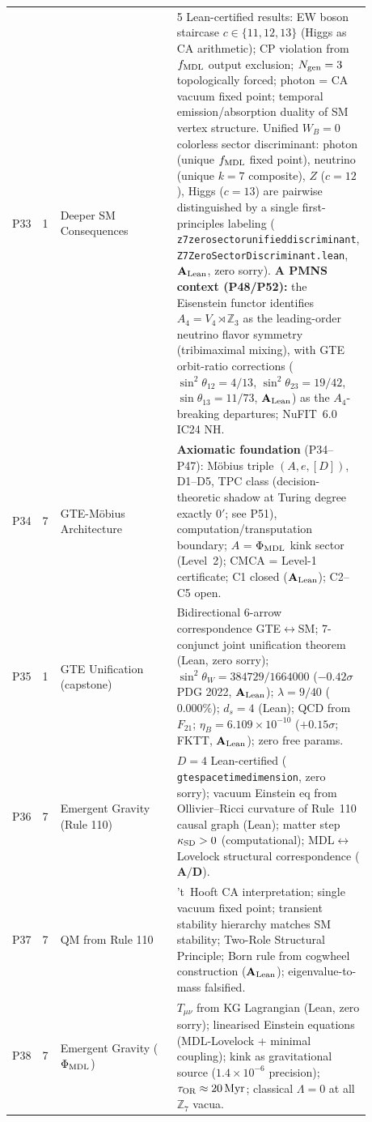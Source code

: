 \documentclass[11pt]{article}
\newcommand{\lean}[1]{%
  \penalty-100
  \begingroup\def\_{{\textunderscore\allowbreak}}\texttt{#1}\endgroup}
\newcommand{\CatAL}{\ensuremath{\textbf{A}_{\rm Lean}}}
\newcommand{\CatAD}{\textbf{A/D}}
\begin{document}
\begin{longtable}{@{}P{0.05\linewidth}P{0.05\linewidth}P{0.33\linewidth}P{0.45\linewidth}@{}}
P33 & 1 & Deeper SM Consequences & 5 Lean-certified results: EW boson staircase $c\in\{11,12,13\}$ (Higgs as CA arithmetic); CP violation from $f_{\rm MDL}$ output exclusion; $N_{\rm gen}=3$ topologically forced; photon = CA vacuum fixed point; temporal emission/absorption duality of SM vertex structure. Unified $W_B{=}0$ colorless sector discriminant: photon (unique $f_{\rm MDL}$ fixed point), neutrino (unique $k{=}7$ composite), $Z$ ($c{=}12$), Higgs ($c{=}13$) are pairwise distinguished by a single first-principles labeling (\lean{z7\_zero\_sector\_unified\_discriminant}, \lean{Z7ZeroSectorDiscriminant.lean}, $\CatAL$, zero sorry). \textbf{A PMNS context (P48/P52):} the Eisenstein functor identifies $A_4 = V_4 \rtimes \mathbb{Z}_3$ as the leading-order neutrino flavor symmetry (tribimaximal mixing), with GTE orbit-ratio corrections ($\sin^2\theta_{12}=4/13$, $\sin^2\theta_{23}=19/42$, $\sin\theta_{13}=11/73$, \CatAL) as the $A_4$-breaking departures; NuFIT~6.0 IC24 NH. \\
P34 & 7 & GTE-Möbius Architecture & \textbf{Axiomatic foundation} (P34--P47): Möbius triple $(A,e,[D])$, D1--D5, TPC class (decision-theoretic shadow at Turing degree exactly $0'$; see P51), computation/transputation boundary; $A$ = $\Phi_{\rm MDL}$ kink sector (Level~2); CMCA = Level-1 certificate; C1 closed ($\CatAL$); C2--C5 open. \\
P35 & 1 & GTE Unification (capstone) & Bidirectional 6-arrow correspondence GTE$\leftrightarrow$SM; 7-conjunct joint unification theorem (Lean, zero sorry); $\sin^2\theta_W = 384729/1664000$ ($-0.42\sigma$ PDG 2022, \CatAL); $\lambda=9/40$ ($0.000\%$); $d_s=4$ (Lean); QCD from $F_{21}$; $\eta_B = 6.109\times10^{-10}$ ($+0.15\sigma$; FKTT, \CatAL); zero free params. \\
P36 & 7 & Emergent Gravity (Rule 110) & $D=4$ Lean-certified (\lean{gte\_spacetime\_dimension}, zero sorry); vacuum Einstein eq from Ollivier--Ricci curvature of Rule~110 causal graph (Lean); matter step $\kappa_{\rm SD}>0$ (computational); MDL$\leftrightarrow$Lovelock structural correspondence ($\CatAD$). \\
P37 & 7 & QM from Rule 110 & 't~Hooft CA interpretation; single vacuum fixed point; transient stability hierarchy matches SM stability; Two-Role Structural Principle; Born rule from cogwheel construction ($\CatAL$); eigenvalue-to-mass falsified. \\
P38 & 7 & Emergent Gravity ($\Phi_{\rm MDL}$) & $T_{\mu\nu}$ from KG Lagrangian (Lean, zero sorry); linearised Einstein equations (MDL-Lovelock + minimal coupling); kink as gravitational source ($1.4\times10^{-6}$ precision); $\tau_{\rm OR}\approx20\,\mathrm{Myr}$; classical $\Lambda=0$ at all $\mathbb{Z}_7$ vacua. \\

\end{longtable}
\end{document}
